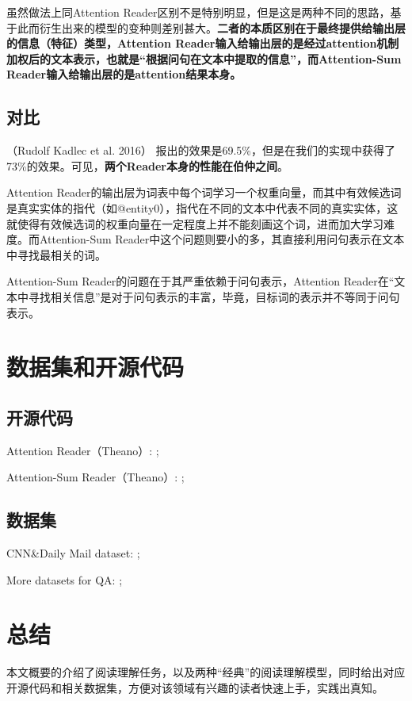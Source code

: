 \documentclass[11pt]{article}
\begin{document}
虽然做法上同Attention Reader区别不是特别明显，但是这是两种不同的思路，基于此而衍生出来的模型的变种则差别甚大。{\bf 二者的本质区别在于最终提供给输出层的信息（特征）类型，Attention Reader输入给输出层的是经过attention机制加权后的文本表示，也就是“根据问句在文本中提取的信息”，而Attention-Sum Reader输入给输出层的是attention结果本身。}

\subsection{对比}
（Rudolf Kadlec et al. 2016）\cite{kadlec2016text} 报出的效果是69.5\%，但是在我们的实现中获得了73\%的效果。可见，{\bf 两个Reader本身的性能在伯仲之间}。

Attention Reader的输出层为词表中每个词学习一个权重向量，而其中有效候选词是真实实体的指代（如@entity0），指代在不同的文本中代表不同的真实实体，这就使得有效候选词的权重向量在一定程度上并不能刻画这个词，进而加大学习难度。而Attention-Sum Reader中这个问题则要小的多，其直接利用问句表示在文本中寻找最相关的词。

Attention-Sum Reader的问题在于其严重依赖于问句表示，Attention Reader在“文本中寻找相关信息”是对于问句表示的丰富，毕竟，目标词的表示并不等同于问句表示。

\section{数据集和开源代码}

\subsection{开源代码}
Attention Reader\cite{chen2016thorough}（Theano）: ;

 \noindent Attention-Sum Reader\cite{kadlec2016text}（Theano）: ;

\subsection{数据集}

CNN\&Daily Mail dataset: ;

 \noindent More datasets for QA: ;
 
 \section{总结}
本文概要的介绍了阅读理解任务，以及两种“经典”的阅读理解模型，同时给出对应开源代码和相关数据集，方便对该领域有兴趣的读者快速上手，实践出真知。
 


\end{document}
